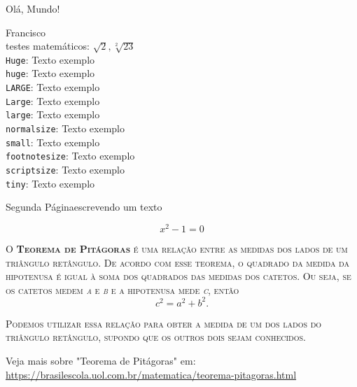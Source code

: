 \documentclass[12pt]{article}
\begin{document}
Olá, Mundo!

Francisco\\
testes matemáticos: $\sqrt{2}, \sqrt[2]{23}$ \\

\noindent \texttt{Huge}:         {\Huge Texto exemplo} \\
\noindent \texttt{huge}:         {\huge Texto exemplo} \\
\noindent \texttt{LARGE}:        {\LARGE Texto exemplo} \\
\noindent \texttt{Large}:        {\Large Texto exemplo} \\
\noindent \texttt{large}:        {\large Texto exemplo} \\
\noindent \texttt{normalsize}:   {\normalsize Texto exemplo} \\
\noindent \texttt{small}:        {\small Texto exemplo} \\
\noindent \texttt{footnotesize}: {\footnotesize Texto exemplo} \\
\noindent \texttt{scriptsize}:   {\scriptsize Texto exemplo} \\
\noindent \texttt{tiny}:         {\tiny Texto exemplo}

\newpage

Segunda Página\hspace{2cm}escrevendo um texto

\begin{equation}
    x^2 - 1 = 0
\end{equation}


\noindent\textsc{O \textbf{Teorema de Pitágoras} é uma relação entre as medidas dos lados
    de um triângulo retângulo. De acordo com esse teorema, o quadrado da medida
    da hipotenusa é igual à soma dos quadrados das medidas dos catetos.
    Ou seja, se os catetos medem \textit{a} e \textit{b} e a hipotenusa mede \textit{c}, então}
\begin{equation}
    c^2 = a^2 + b^2.
\end{equation}

\noindent\textsc{Podemos utilizar essa relação para obter a medida de um
    dos lados do triângulo retângulo, supondo que os outros dois sejam conhecidos.}

Veja mais sobre "Teorema de Pitágoras" em:
\url{https://brasilescola.uol.com.br/matematica/teorema-pitagoras.html}
\end{document}
